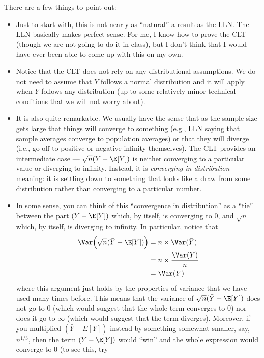 \documentclass[
  letterpaper,
  DIV=11,
  numbers=noendperiod]{scrreprt}
\begin{document}
There are a few things to point out:

\begin{itemize}
\item
  Just to start with, this is not nearly as ``natural'' a result as the
  LLN. The LLN basically makes perfect sense. For me, I know how to
  prove the CLT (though we are not going to do it in class), but I don't
  think that I would have ever been able to come up with this on my own.
\item
  Notice that the CLT does not rely on any distributional assumptions.
  We do not need to assume that \(Y\) follows a normal distribution and
  it will apply when \(Y\) follows any distribution (up to some
  relatively minor technical conditions that we will not worry about).
\item
  It is also quite remarkable. We usually have the sense that as the
  sample size gets large that things will converge to something (e.g.,
  LLN saying that sample averages converge to population averages) or
  that they will diverge (i.e., go off to positive or negative infinity
  themselves). The CLT provides an intermediate case ---
  \(\sqrt{n}(\bar{Y} - \E[Y])\) is neither converging to a particular
  value or diverging to infinity. Instead, it is \emph{converging in
  distribution} --- meaning: it is settling down to something that looks
  like a draw from some distribution rather than converging to a
  particular number.
\item
  In some sense, you can think of this ``convergence in distribution''
  as a ``tie'' between the part \((\bar{Y}-\E[Y])\) which, by itself, is
  converging to 0, and \(\sqrt{n}\) which, by itself, is diverging to
  infinity. In particular, notice that \begin{align*}
  \Var\Big( \sqrt{n} (\bar{Y} - \E[Y]) \Big) &= n \times \Var(\bar{Y}) \\
  &= n \times \frac{\Var(Y)}{n} \\
  &= \Var(Y)
  \end{align*} where this argument just holds by the properties of
  variance that we have used many times before. This means that the
  variance of \(\sqrt{n}(\bar{Y}-\E[Y])\) does not go to 0 (which would
  suggest that the whole term converges to 0) nor does it go to
  \(\infty\) (which would suggest that the term diverges). Moreover, if
  you multiplied \((\bar{Y}-E[Y])\) instead by something somewhat
  smaller, say, \(n^{1/3}\), then the term \((\bar{Y}-\E[Y])\) would
  ``win'' and the whole expression would converge to 0 (to see this, try

\end{itemize}
\end{document}
